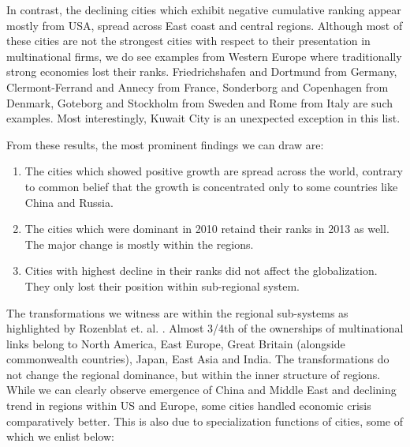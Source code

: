 		In contrast, the declining cities which exhibit negative cumulative ranking appear mostly from USA, spread across East coast and central regions. Although most of these cities are not the strongest cities with respect to their presentation in multinational firms, we do see examples from Western Europe where traditionally strong economies lost their ranks. Friedrichshafen and Dortmund from Germany, Clermont-Ferrand and Annecy from France, Sonderborg and Copenhagen from Denmark, Goteborg and Stockholm from Sweden and Rome from Italy are such examples. Most interestingly, Kuwait City is an unexpected exception in this list.
		
		From these results, the most prominent findings we can draw are:
		
		\begin{enumerate}
			\item The cities which showed positive growth are spread across the world, contrary to common belief that the growth is concentrated only to some countries like China and Russia.
			
			\item The cities which were dominant in 2010 retaind their ranks in 2013 as well. The major change is mostly within the regions.
			
			\item Cities with highest decline in their ranks did not affect the globalization. They only lost their position within sub-regional system.
		\end{enumerate}
		
		The transformations we witness are within the regional sub-systems as highlighted by Rozenblat et. al. \cite{rozenblat2017}. Almost 3/4th of the ownerships of multinational links belong to North America, East Europe, Great Britain (alongside commonwealth countries), Japan, East Asia and India. The transformations do not change the regional dominance, but within the inner structure of regions. While we can clearly observe emergence of China and Middle East and declining trend in regions within US and Europe, some cities handled economic crisis comparatively better. This is also due to specialization functions of cities, some of which we enlist below:
		
